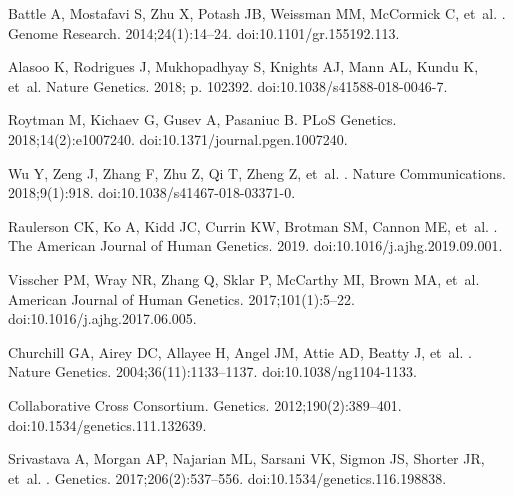 \documentclass[10pt,letterpaper]{article}
\begin{document}
\begin{thebibliography}{10}
Battle A, Mostafavi S, Zhu X, Potash JB, Weissman MM, McCormick C, et~al.
.
\newblock Genome Research. 2014;24(1):14--24.
\newblock doi:{10.1101/gr.155192.113}.

Alasoo K, Rodrigues J, Mukhopadhyay S, Knights AJ, Mann AL, Kundu K, et~al.
\newblock Nature Genetics. 2018; p. 102392.
\newblock doi:{10.1038/s41588-018-0046-7}.

Roytman M, Kichaev G, Gusev A, Pasaniuc B.
\newblock PLoS Genetics. 2018;14(2):e1007240.
\newblock doi:{10.1371/journal.pgen.1007240}.

Wu Y, Zeng J, Zhang F, Zhu Z, Qi T, Zheng Z, et~al.
.
\newblock Nature Communications. 2018;9(1):918.
\newblock doi:{10.1038/s41467-018-03371-0}.

Raulerson CK, Ko A, Kidd JC, Currin KW, Brotman SM, Cannon ME, et~al.
.
\newblock The American Journal of Human Genetics. 2019.
\newblock doi:{10.1016/j.ajhg.2019.09.001}.

Visscher PM, Wray NR, Zhang Q, Sklar P, McCarthy MI, Brown MA, et~al.
\newblock American Journal of Human Genetics. 2017;101(1):5--22.
\newblock doi:{10.1016/j.ajhg.2017.06.005}.

Churchill GA, Airey DC, Allayee H, Angel JM, Attie AD, Beatty J, et~al.
.
\newblock Nature Genetics. 2004;36(11):1133--1137.
\newblock doi:{10.1038/ng1104-1133}.

{Collaborative Cross Consortium}.
\newblock Genetics. 2012;190(2):389--401.
\newblock doi:{10.1534/genetics.111.132639}.

Srivastava A, Morgan AP, Najarian ML, Sarsani VK, Sigmon JS, Shorter JR, et~al.
.
\newblock Genetics. 2017;206(2):537--556.
\newblock doi:{10.1534/genetics.116.198838}.


\end{thebibliography}
\end{document}
